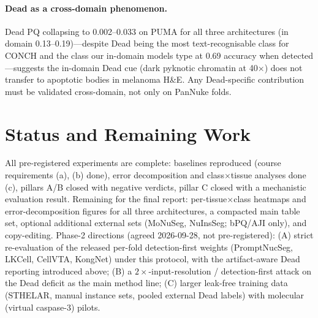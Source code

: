 \documentclass[11pt]{article}
\begin{document}
\paragraph{Dead as a cross-domain phenomenon.} Dead PQ collapsing to 0.002--0.033 on PUMA for
all three architectures (in domain 0.13--0.19)---despite Dead being the most text-recognisable
class for CONCH and the class our
in-domain models type at 0.69 accuracy when detected---suggests the in-domain Dead cue (dark
pyknotic chromatin at 40$\times$) does not transfer to apoptotic bodies in melanoma H\&E.
Any Dead-specific contribution must be validated cross-domain, not only on PanNuke folds.

\section{Status and Remaining Work}
\label{sec:status}

All pre-registered experiments are complete: baselines reproduced (course requirements (a),
(b) done), error decomposition and class$\times$tissue analyses done (c), pillars A/B closed
with negative verdicts, pillar C closed with a mechanistic evaluation result. Remaining for the
final report: per-tissue$\times$class heatmaps and error-decomposition figures for all three
architectures, a compacted main table set, optional additional external sets (MoNuSeg,
NuInsSeg; bPQ/AJI only), and copy-editing. Phase-2 directions (agreed 2026-09-28, not
pre-registered): (A) strict re-evaluation of the released per-fold detection-first weights
(PromptNucSeg, LKCell, CellVTA, KongNet) under this protocol, with the artifact-aware Dead
reporting introduced above; (B) a $2\times$-input-resolution / detection-first attack on the
Dead deficit as the main method line; (C) larger leak-free training data (STHELAR, manual
instance sets, pooled external Dead labels) with molecular (virtual caspase-3) pilots.
\end{document}
